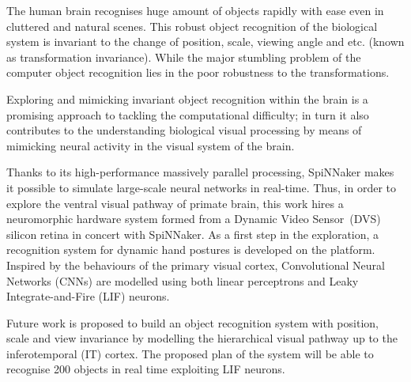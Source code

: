 %

%
%
%
%

%

The human brain recognises huge amount of objects rapidly with ease even in cluttered and natural scenes.
This robust object recognition of the biological system is invariant to the change of position, scale, viewing angle and etc. (known as transformation invariance).
While the major stumbling problem of the computer object recognition lies in the poor robustness to the transformations.

Exploring and mimicking invariant object recognition within the brain is a promising approach to tackling the computational difficulty;
in turn it also contributes to the understanding biological visual processing by means of mimicking neural activity in the visual system of the brain.

Thanks to its high-performance massively parallel processing, SpiNNaker makes it possible to simulate large-scale neural networks in real-time.
Thus, in order to explore the ventral visual pathway of primate brain, this work hires a neuromorphic hardware system formed from a Dynamic Video Sensor~(DVS) silicon retina in concert with SpiNNaker.
As a first step in the exploration, a recognition system for dynamic hand postures is developed on the platform.
Inspired by the behaviours of the primary visual cortex, Convolutional Neural Networks (CNNs) are modelled using both linear perceptrons and Leaky Integrate-and-Fire (LIF) neurons.

Future work is proposed to build an object recognition system with position, scale and view invariance by modelling the hierarchical visual pathway up to the inferotemporal (IT) cortex.
The proposed plan of the system will be able to recognise 200 objects in real time exploiting LIF neurons.

